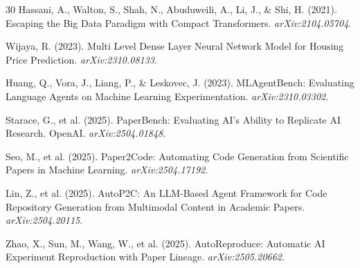 \documentclass[10pt,twocolumn]{article}
\begin{document}
\begin{thebibliography}{30}
Hassani, A., Walton, S., Shah, N., Abuduweili, A., Li, J., \& Shi, H. (2021).
Escaping the Big Data Paradigm with Compact Transformers. \textit{arXiv:2104.05704}.

Wijaya, R. (2023).
Multi Level Dense Layer Neural Network Model for Housing Price Prediction.
\textit{arXiv:2310.08133}.

Huang, Q., Vora, J., Liang, P., \& Leskovec, J. (2023).
MLAgentBench: Evaluating Language Agents on Machine Learning Experimentation.
\textit{arXiv:2310.03302}.

Starace, G., et al. (2025).
PaperBench: Evaluating AI's Ability to Replicate AI Research. OpenAI.
\textit{arXiv:2504.01848}.

Seo, M., et al. (2025).
Paper2Code: Automating Code Generation from Scientific Papers in Machine Learning.
\textit{arXiv:2504.17192}.

Lin, Z., et al. (2025).
AutoP2C: An LLM-Based Agent Framework for Code Repository Generation from Multimodal Content in
Academic Papers. \textit{arXiv:2504.20115}.

Zhao, X., Sun, M., Wang, W., et al. (2025).
AutoReproduce: Automatic AI Experiment Reproduction with Paper Lineage.
\textit{arXiv:2505.20662}.

\end{thebibliography}
\end{document}
